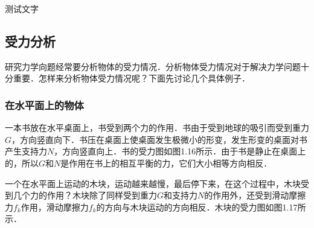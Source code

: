 \begin{Case*}
	\item 测试文字
\end{Case*}


\subsection{受力分析}
研究力学向题经常要分析物体的受力情况．分析物体受力情况对于解决力学问题十分重要．怎样来分析物体受力情况呢？下面先讨论几个具体例子．


\subsubsection{在水平面上的物体}
一本书放在水平桌面上，书受到两个力的作用．书由于受到地球的吸引而受到重力$G$，方向竖直向下．书压在桌面上使桌面发生极微小的形变，发生形变的桌面对书产生支持力$N$，方向竖直向上．书的受力图如图1.16所示．由于书是静止在桌面上的，所以$G$和$N$是作用在书上的相互平衡的力，它们大小相等方向相反．
\begin{figure}[H]
    \centering
    \caption{}
\end{figure}

一个在水平面上运动的木块，运动越来越慢，最后停下来，在这个过程中，木块受到几个力的作用？木块除了同样受到重力$G$和支持力$N$的作用外，还受到滑动摩擦力$f_k$作用，滑动摩擦力$f_k$的方向与木块运动的方向相反．木块的受力图如图1.17所示．

